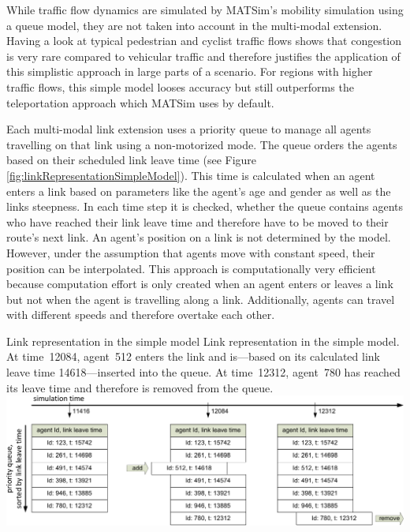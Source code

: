 While traffic flow dynamics are simulated by MATSim's mobility simulation using a queue model, they are not taken into account in the multi-modal extension. Having a look at typical pedestrian and cyclist traffic flows shows that congestion is very rare compared to vehicular traffic and therefore justifies the application of this simplistic approach in large parts of a scenario. For regions with higher traffic flows, this simple model looses accuracy but still outperforms the teleportation approach which MATSim uses by default.

Each multi-modal link extension uses a priority queue to manage all agents travelling on that link using a non-motorized mode. The queue orders the agents based on their scheduled link leave time (see Figure \ref{fig:linkRepresentationSimpleModel}). This time is calculated when an agent enters a link based on parameters like the agent's age and gender as well as the links steepness. In each time step it is checked, whether the queue contains agents who have reached their link leave time and therefore have to be moved to their route's next link. An agent's position on a link is not determined by the model. However, under the assumption that agents move with constant speed, their position can be interpolated. This approach is computationally very efficient because computation effort is only created when an agent enters or leaves a link but not when the agent is travelling along a link. Additionally, agents can travel with different speeds and therefore overtake each other.

\createfigure%
{Link representation in the simple model}%
{Link representation in the simple model. \\At time~12084, agent~512 enters the link and is---based on its calculated link leave time 14618---inserted into the queue. At time~12312, agent~780 has reached its leave time and therefore is removed from the queue.}%
{\label{fig:linkRepresentationSimpleModel}}%
{\includegraphics[width=1.0\textwidth, angle=0]{extending/figures/MultiModalSimulation/linkRepresentation}}%
{}

